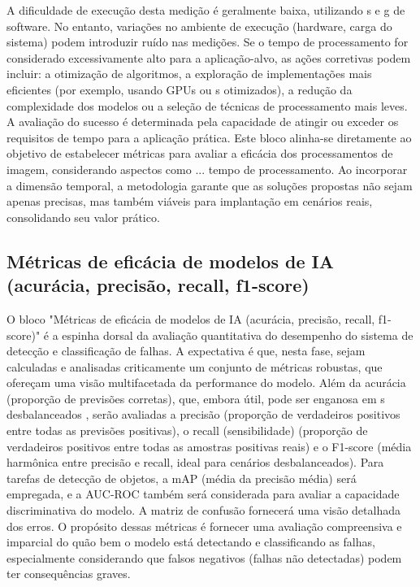 A dificuldade de execução desta medição é geralmente baixa, utilizando s e g de software. No entanto, variações no ambiente de execução (hardware, carga do sistema) podem introduzir ruído nas medições. Se o tempo de processamento for considerado excessivamente alto para a aplicação-alvo, as ações corretivas podem incluir: a otimização de algoritmos, a exploração de implementações mais eficientes (por exemplo, usando GPUs ou s otimizados), a redução da complexidade dos modelos ou a seleção de técnicas de processamento mais leves. A avaliação do sucesso é determinada pela capacidade de atingir ou exceder os requisitos de tempo para a aplicação prática. Este bloco alinha-se diretamente ao objetivo de estabelecer métricas para avaliar a eficácia dos processamentos de imagem, considerando aspectos como ... tempo de processamento. Ao incorporar a dimensão temporal, a metodologia garante que as soluções propostas não sejam apenas precisas, mas também viáveis para implantação em cenários reais, consolidando seu valor prático.

\subsection{Métricas de eficácia de modelos de IA (acurácia, precisão, recall, f1-score)}
O bloco "Métricas de eficácia de modelos de IA (acurácia, precisão, recall, f1-score)" é a espinha dorsal da avaliação quantitativa do desempenho do sistema de detecção e classificação de falhas. A expectativa é que, nesta fase, sejam calculadas e analisadas criticamente um conjunto de métricas robustas, que ofereçam uma visão multifacetada da performance do modelo. Além da acurácia (proporção de previsões corretas), que, embora útil, pode ser enganosa em s desbalanceados \cite{He2009}, serão avaliadas a precisão (proporção de verdadeiros positivos entre todas as previsões positivas), o recall (sensibilidade) (proporção de verdadeiros positivos entre todas as amostras positivas reais) e o F1-score (média harmônica entre precisão e recall, ideal para cenários desbalanceados). Para tarefas de detecção de objetos, a mAP (média da precisão média) será empregada, e a AUC-ROC também será considerada para avaliar a capacidade discriminativa do modelo. A matriz de confusão fornecerá uma visão detalhada dos erros. O propósito dessas métricas é fornecer uma avaliação compreensiva e imparcial do quão bem o modelo está detectando e classificando as falhas, especialmente considerando que falsos negativos (falhas não detectadas) podem ter consequências graves.

